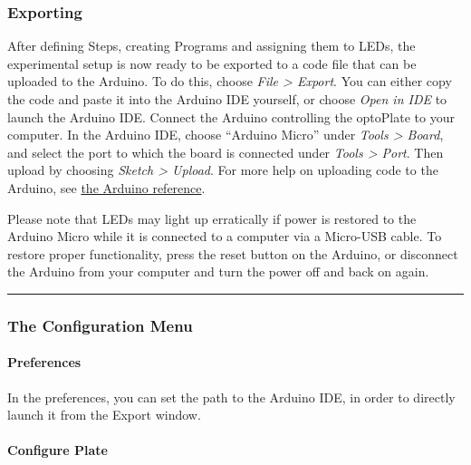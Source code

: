 \hypertarget{exporting}{%
\subsubsection{Exporting}\label{exporting}}

After defining Steps, creating Programs and assigning them to LEDs, the
experimental setup is now ready to be exported to a code file that can
be uploaded to the Arduino. To do this, choose \emph{File \textgreater{}
Export}. You can either copy the code and paste it into the Arduino IDE
yourself, or choose \emph{Open in IDE} to launch the Arduino IDE.
Connect the Arduino controlling the optoPlate to your computer. In the
Arduino IDE, choose ``Arduino Micro'' under \emph{Tools \textgreater{}
Board}, and select the port to which the board is connected under
\emph{Tools \textgreater{} Port}. Then upload by choosing \emph{Sketch
\textgreater{} Upload}. For more help on uploading code to the Arduino,
see \href{https://www.arduino.cc/en/Guide/Environment\#uploading}{the
Arduino reference}.

Please note that LEDs may light up erratically if power is restored to
the Arduino Micro while it is connected to a computer via a Micro-USB
cable. To restore proper functionality, press the reset button on the
Arduino, or disconnect the Arduino from your computer and turn the power
off and back on again.

\begin{center}\rule{0.5\linewidth}{0.5pt}\end{center}

\hypertarget{the-configuration-menu}{%
\subsubsection{The Configuration Menu}\label{the-configuration-menu}}

\hypertarget{preferences}{%
\paragraph{Preferences}\label{preferences}}

In the preferences, you can set the path to the Arduino IDE, in order to
directly launch it from the Export window.

\hypertarget{configure-plate}{%
\paragraph{Configure Plate}\label{configure-plate}}

